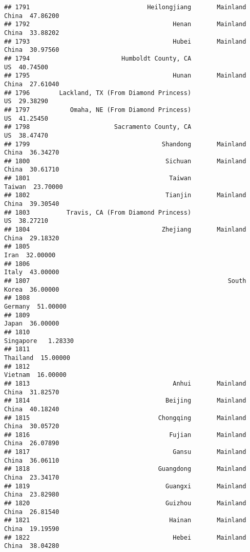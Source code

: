 \documentclass[
]{article}
\begin{document}
\begin{verbatim}
## 1791                                Heilongjiang       Mainland China  47.86200
## 1792                                       Henan       Mainland China  33.88202
## 1793                                       Hubei       Mainland China  30.97560
## 1794                         Humboldt County, CA                   US  40.74500
## 1795                                       Hunan       Mainland China  27.61040
## 1796        Lackland, TX (From Diamond Princess)                   US  29.38290
## 1797           Omaha, NE (From Diamond Princess)                   US  41.25450
## 1798                       Sacramento County, CA                   US  38.47470
## 1799                                    Shandong       Mainland China  36.34270
## 1800                                     Sichuan       Mainland China  30.61710
## 1801                                      Taiwan               Taiwan  23.70000
## 1802                                     Tianjin       Mainland China  39.30540
## 1803          Travis, CA (From Diamond Princess)                   US  38.27210
## 1804                                    Zhejiang       Mainland China  29.18320
## 1805                                                             Iran  32.00000
## 1806                                                            Italy  43.00000
## 1807                                                      South Korea  36.00000
## 1808                                                          Germany  51.00000
## 1809                                                            Japan  36.00000
## 1810                                                        Singapore   1.28330
## 1811                                                         Thailand  15.00000
## 1812                                                          Vietnam  16.00000
## 1813                                       Anhui       Mainland China  31.82570
## 1814                                     Beijing       Mainland China  40.18240
## 1815                                   Chongqing       Mainland China  30.05720
## 1816                                      Fujian       Mainland China  26.07890
## 1817                                       Gansu       Mainland China  36.06110
## 1818                                   Guangdong       Mainland China  23.34170
## 1819                                     Guangxi       Mainland China  23.82980
## 1820                                     Guizhou       Mainland China  26.81540
## 1821                                      Hainan       Mainland China  19.19590
## 1822                                       Hebei       Mainland China  38.04280

\end{verbatim}
\end{document}
